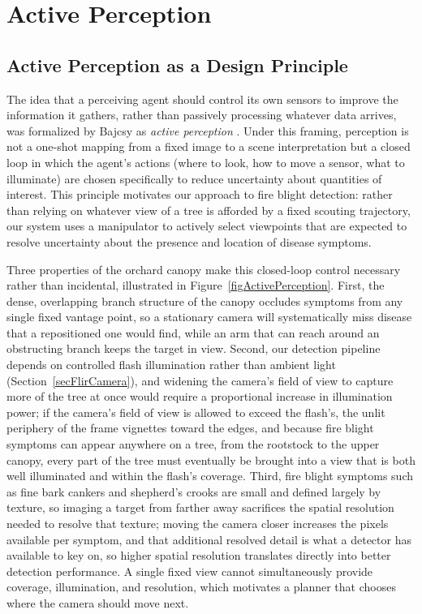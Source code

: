 
\section{Active Perception} \label{secActivePerception}

\subsection{Active Perception as a Design Principle} \label{secActivePerceptionFoundations}

The idea that a perceiving agent should control its own sensors to improve the
information it gathers, rather than passively processing whatever data
arrives, was formalized by Bajcsy as \textit{active perception}
\cite{Bajcsy1988ActivePerception}.
Under this framing, perception is not a one-shot mapping from a fixed image to
a scene interpretation but a closed loop in which the agent's actions (where
to look, how to move a sensor, what to illuminate) are chosen specifically to
reduce uncertainty about quantities of interest.
This principle motivates our approach to fire blight detection: rather than
relying on whatever view of a tree is afforded by a fixed scouting trajectory,
our system uses a manipulator to actively select viewpoints that are expected
to resolve uncertainty about the presence and location of disease symptoms.

Three properties of the orchard canopy make this closed-loop control necessary
rather than incidental, illustrated in Figure~\ref{figActivePerception}.
First, the dense, overlapping branch structure of the canopy occludes
symptoms from any single fixed vantage point, so a stationary camera will
systematically miss disease that a repositioned one would find, while an arm
that can reach around an obstructing branch keeps the target in view.
Second, our detection pipeline depends on controlled flash illumination
rather than ambient light (Section~\ref{secFlirCamera}), and widening the
camera's field of view to capture more of the tree at once would require a
proportional increase in illumination power; if the camera's field of view is
allowed to exceed the flash's, the unlit periphery of the frame vignettes
toward the edges, and because fire blight symptoms can appear anywhere on a
tree, from the rootstock to the upper canopy, every part of the tree must
eventually be brought into a view that is both well illuminated and within
the flash's coverage.
Third, fire blight symptoms such as fine bark cankers and shepherd's crooks
are small and defined largely by texture, so imaging a target from farther
away sacrifices the spatial resolution needed to resolve that texture;
moving the camera closer increases the pixels available per symptom, and
that additional resolved detail is what a detector has available to key on,
so higher spatial resolution translates directly into better detection
performance.
A single fixed view cannot simultaneously provide coverage, illumination,
and resolution, which motivates a planner that chooses where the camera
should move next.

